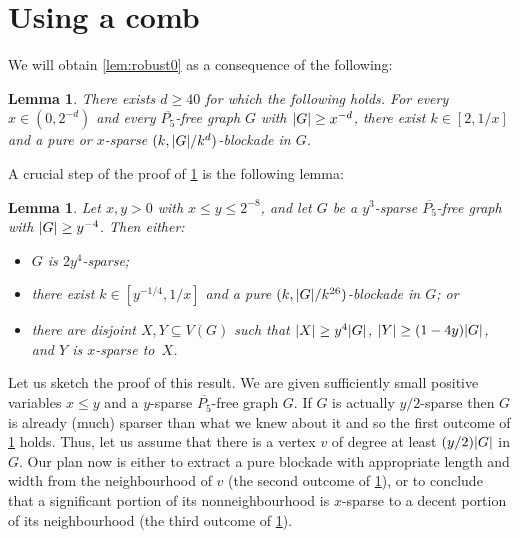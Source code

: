 \documentclass[11pt,reqno,a4paper]{amsart}
\newtheorem{lemma}[theorem]{Lemma}
\renewcommand{\subset}{\subseteq}
\DeclarePairedDelimiter\abs{\lvert}{\rvert}%
\begin{document}
	\section{Using a comb}
	\label{sec:1stround}
	We will obtain \cref{lem:robust0} as a consequence of the following:
	\begin{lemma}
		\label{lem:house40}
		There exists $d\ge40$ for which the following holds.
		For every $x\in(0,2^{-d})$ and every $\overline{P_5}$-free graph $G$ with $\abs G\ge x^{-d}$, there exist $k\in[2,1/x]$ and a pure or $x$-sparse $(k,\abs G/k^d)$-blockade in $G$.
	\end{lemma}
	A crucial step of the proof of \cref{lem:house40} is the following lemma:
	
	\begin{lemma}
		\label{lem:house1}
		Let $x,y>0$ with $x\le y\le 2^{-8}$,
		and let $G$ be a $y^3$-sparse $\overline{P_5}$-free graph with $\abs G\ge y^{-4}$. Then either:
		\begin{itemize}
			\item $G$ is $2y^4$-sparse;
			
			\item there exist $k\in[y^{-1/4},1/x]$ and a pure $(k,\abs G/k^{26})$-blockade in $G$; or
			
			\item there are disjoint $X,Y\subset V(G)$ such that $\abs X\ge{y^4\abs G}$, $\abs Y\ge(1-4y)\abs G$, and $Y$ is $x$-sparse to~$X$.
		\end{itemize}
	\end{lemma}
	
	Let us sketch the proof of this result.
	We are given sufficiently small positive variables $x\le y$ and a $y$-sparse $\overline{P_5}$-free graph $G$.
	If $G$ is actually $y/2$-sparse then $G$ is already (much) sparser than what we knew about it and so the first outcome of \cref{lem:house1} holds.
	Thus, let us assume that there is a vertex $v$ of degree at least $(y/2)\abs G$ in $G$.
	Our plan now is either to extract a pure blockade with appropriate length and width from the neighbourhood of $v$ (the second outcome of \cref{lem:house1}), or to conclude that a significant portion of its nonneighbourhood is $x$-sparse to a decent portion of its neighbourhood (the third outcome of \cref{lem:house1}).
	
\end{document}

